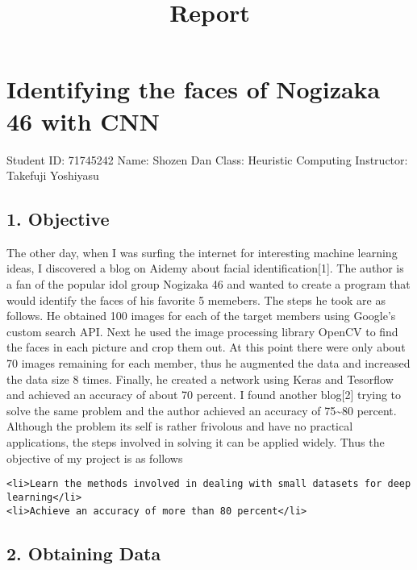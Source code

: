 \documentclass[11pt]{article}
\title{Report}
\begin{document}
    
    
    \maketitle
    
    

    
    \section{Identifying the faces of Nogizaka 46 with
CNN}\label{identifying-the-faces-of-nogizaka-46-with-cnn}

Student ID: 71745242 Name: Shozen Dan Class: Heuristic Computing
Instructor: Takefuji Yoshiyasu

    \subsection{1. Objective}\label{objective}

The other day, when I was surfing the internet for interesting machine
learning ideas, I discovered a blog on Aidemy about facial
identification{[}1{]}. The author is a fan of the popular idol group
Nogizaka 46 and wanted to create a program that would identify the faces
of his favorite 5 memebers. The steps he took are as follows. He
obtained 100 images for each of the target members using Google's custom
search API. Next he used the image processing library OpenCV to find the
faces in each picture and crop them out. At this point there were only
about 70 images remaining for each member, thus he augmented the data
and increased the data size 8 times. Finally, he created a network using
Keras and Tesorflow and achieved an accuracy of about 70 percent. I
found another blog{[}2{]} trying to solve the same problem and the
author achieved an accuracy of 75\textasciitilde{}80 percent. Although
the problem its self is rather frivolous and have no practical
applications, the steps involved in solving it can be applied widely.
Thus the objective of my project is as follows

\begin{verbatim}
<li>Learn the methods involved in dealing with small datasets for deep learning</li>
<li>Achieve an accuracy of more than 80 percent</li>
\end{verbatim}

    \subsection{2. Obtaining Data}\label{obtaining-data}
\end{document}
